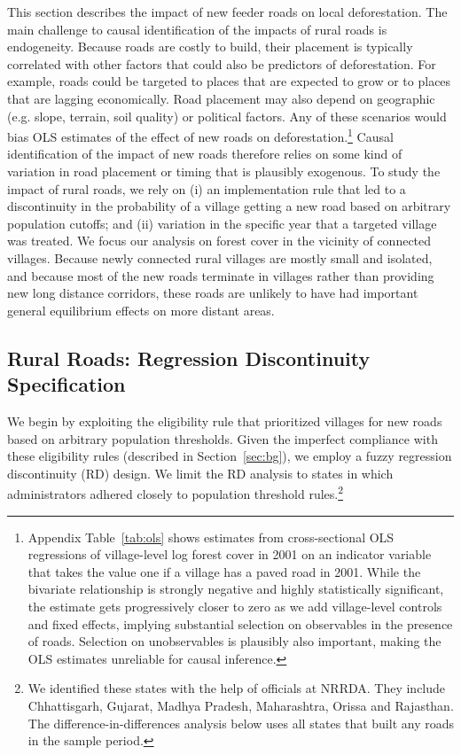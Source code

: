 This section describes the impact of new feeder roads on local
deforestation. The main challenge to causal identification of the
impacts of rural roads is endogeneity.  Because roads are costly to
build, their placement is typically correlated with other factors that
could also be predictors of deforestation. For example, roads could be
targeted to places that are expected to grow or to places that are
lagging economically. Road placement may also depend on geographic
(e.g. slope, terrain, soil quality) or political factors.  Any of
these scenarios would bias OLS estimates of the effect of new roads on
deforestation.\footnote{Appendix Table~\ref{tab:ols} shows estimates
  from cross-sectional OLS regressions of village-level log forest
  cover in 2001 on an indicator variable that takes the value one if a
  village has a paved road in 2001. While the bivariate relationship
  is strongly negative and highly statistically significant, the
  estimate gets progressively closer to zero as we add village-level
  controls and fixed effects, implying substantial selection on
  observables in the presence of roads. Selection on unobservables is
  plausibly also important, making the OLS estimates unreliable for
  causal inference.}  Causal identification of the impact of new roads
therefore relies on some kind of variation in road placement or timing
that is plausibly exogenous. To study the impact of rural roads, we
rely on (i) an implementation rule that led to a discontinuity in the
probability of a village getting a new road based on arbitrary
population cutoffs; and (ii) variation in the specific year that a
targeted village was treated. We focus our analysis on forest cover in
the vicinity of connected villages. Because newly connected rural
villages are mostly small and isolated, and because most of the new
roads terminate in villages rather than providing new long distance
corridors, these roads are unlikely to have had important general
equilibrium effects on more distant areas.

\subsection{Rural Roads: Regression Discontinuity Specification}

We begin by exploiting the eligibility rule that prioritized villages
for new roads based on arbitrary population thresholds. Given the
imperfect compliance with these eligibility rules (described in
Section~\ref{sec:bg}), we employ a fuzzy regression discontinuity (RD)
design. 
We limit the RD analysis to
states in which administrators adhered closely to
population threshold rules.\footnote{We identified these states with
  the help of officials at NRRDA. They include Chhattisgarh, Gujarat,
  Madhya Pradesh, Maharashtra, Orissa and Rajasthan. The
  difference-in-differences analysis below uses all states that built
  any roads in the sample period.} 

